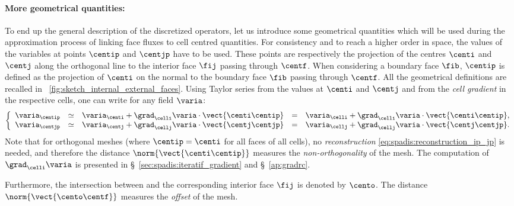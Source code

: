  \paragraph{More geometrical quantities:}
To end up the general description of the discretized operators, let us introduce some geometrical 
quantities which will be used during the approximation process of linking face fluxes to 
cell centred quantities. 
For consistency and to reach a higher order in space, the values of the
variables at points $\centip$ and $\centjp$ have to be used. 
These points are respectively the projection of the centres $\centi$ and $\centj$ 
along the orthogonal line to the interior face $\fij$ passing through $\centf$. 
When considering a boundary face $\fib$, $\centip$ is defined as the projection of $\centi$
on the normal to the boundary face $\fib$ passing through $\centf$. All the geometrical
definitions are recalled in \figurename~\ref{fig:sketch_internal_external_faces}.
%
Using Taylor series from the values at $\centi$ and $\centj$ and from the \emph{cell gradient}
in the respective cells, one can write for any field $\varia$:
\begin{equation}\label{eq:spadis:reconstruction_ip_jp}
\left\lbrace
\begin{array}{r c l c l}
\varia_\centip &\simeq & \varia_\centi + \grad_\celli \varia \cdot \vect{\centi \centip} &=& \varia_\celli + \grad_\celli \varia \cdot \vect{\centi \centip},  \\
\varia_\centjp &\simeq & \varia_\centj + \grad_\cellj \varia \cdot \vect{\centj \centjp} & =& \varia_\cellj + \grad_\cellj \varia \cdot \vect{\centj \centjp}. 
\end{array}
\right.
\end{equation}
Note that for orthogonal meshes (where $\centip = \centi$ for all faces of all cells), 
no \emph{reconstruction} \eqref{eq:spadis:reconstruction_ip_jp} is needed, 
and therefore the distance $\norm{\vect{\centi \centip}}$ measures the \emph{non-orthogonality} of the mesh.
The computation of $\grad_\celli \varia$ is presented in  \S~\ref{sec:spadis:iteratif_gradient} and \S~\ref{ap:gradrc}.

Furthermore, the intersection between \vect{\centi \centj} and the corresponding interior face $\fij$ is denoted by $\cento$. 
The distance $\norm{\vect{\cento \centf}}$ measures the \emph{offset} of the mesh. 

